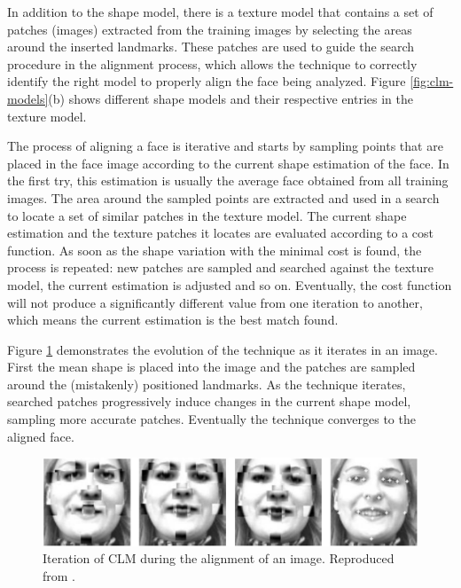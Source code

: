 In addition to the shape model, there is a texture model that contains a set of patches (images) extracted from the training images by selecting the areas around the inserted landmarks. These patches are used to guide the search procedure in the alignment process, which allows the technique to correctly identify the right model to properly align the face being analyzed. Figure \ref{fig:clm-models}(b) shows different shape models and their respective entries in the texture model.

The process of aligning a face is iterative and starts by sampling points that are placed in the face image according to the current shape estimation of the face. In the first try, this estimation is usually the average face obtained from all training images. The area around the sampled points are extracted and used in a search to locate a set of similar patches in the texture model. The current shape estimation and the texture patches it locates are evaluated according to a cost function. As soon as the shape variation with the minimal cost is found, the process is repeated: new patches are sampled and searched against the texture model, the current estimation is adjusted and so on. Eventually, the cost function will not produce a significantly different value from one iteration to another, which means the current estimation is the best match found.

Figure \ref{fig:clm-evolution} demonstrates the evolution of the technique as it iterates in an image. First the mean shape is placed into the image and the patches are sampled around the (mistakenly) positioned landmarks. As the technique iterates, searched patches progressively induce changes in the current shape model, sampling more accurate patches. Eventually the technique converges to the aligned face.

\begin{figure}[h]
    \centering
    \includegraphics[width=\linewidth]{Content/figures/clm-evolution.jpg}
    \caption{Iteration of CLM during the alignment of an image. Reproduced from \textcite{cristinacce2006feature}.}
    \label{fig:clm-evolution}
\end{figure}

